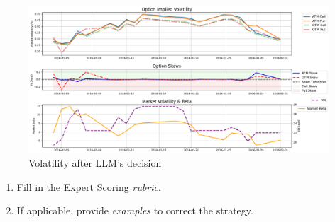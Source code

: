 \documentclass[8pt]{scrartcl}
\begin{document}
\begin{figure}[H]
    \centering
    \includegraphics[width=1\linewidth]{judge_reviews/META_M_gpt-4o-mini/2016-01-01/llm_Market_Volatility_&_Beta.png}
    \caption{Volatility after LLM's decision}
\end{figure}

\begin{tcolorbox}[colback=blue!10, colframe=blue!60, title=\textbf{TASKS}, sharp corners=southwest]
\begin{enumerate}
    \item Fill in the Expert Scoring \textit{rubric}.
    \item If applicable, provide \textit{examples} to correct the strategy.
\end{enumerate}
\end{tcolorbox}
\newpage
\end{document}
